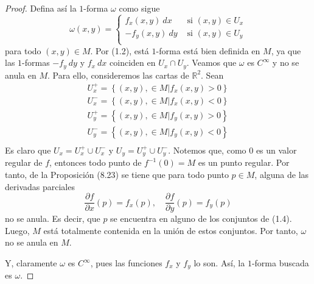 \documentclass[12pt]{report}
\theoremstyle{largebreak}
\begin{document}
\begin{proof}
        Defina así la $1$-forma $\omega$ como sigue
        \begin{equation}
            \omega(x,y)=\left\{
                \begin{aligned}
                    f_x(x,y)\:dx & \text{ si }(x,y)\in U_x\\
                    -f_y(x,y)\:dy & \text{ si }(x,y)\in U_y\\
                \end{aligned} 
            \right.
        \end{equation}
        para todo $(x,y)\in M$. Por (1.2), está $1$-forma está bien definida en $M$, ya que las $1$-formas $-f_y\:dy$ y $f_x\:dx$ coinciden en $U_x\cap U_y$. Veamos que $\omega$ es $C^\infty$ y no se anula en $M$. Para ello, consideremos las cartas de $\mathbb{R}^2$. Sean
        \begin{equation}
            \begin{split}
                U_x^+=\left\{(x,y),\in M|f_x(x,y)>0\right\}\\
                U_x^-=\left\{(x,y),\in M|f_x(x,y)<0\right\}\\
                U_y^+= \left\{(x,y),\in M|f_y(x,y)>0\right\}\\
                U_y^-=\left\{(x,y),\in M|f_y(x,y)<0\right\}\\
        \end{split}
        \end{equation}
        Es claro que $U_x=U_x^+\cup U_x^-$ y $U_y=U_y^+\cup U_y^-$. Notemos que, como $0$ es un valor regular de $f$, entonces todo punto de $f^{-1}(0)=M$ es un punto regular. Por tanto, de la Proposición (8.23) se tiene que para todo punto $p\in M$, alguna de las derivadas parciales
        \begin{equation*}
            \frac{\partial f}{\partial x}(p)=f_x(p),\quad\frac{\partial f}{\partial y}(p)=f_y(p)
        \end{equation*}
        no se anula. Es decir, que $p$ se encuentra en alguno de los conjuntos de (1.4). Luego, $M$ está totalmente contenida en la unión de estos conjuntos. Por tanto, $\omega$ no se anula en $M$.
        
        Y, claramente $\omega$ es $C^\infty$, pues las funciones $f_x$ y $f_y$ lo son. Así, la $1$-forma buscada es $\omega$.


\end{proof}
\end{document}
